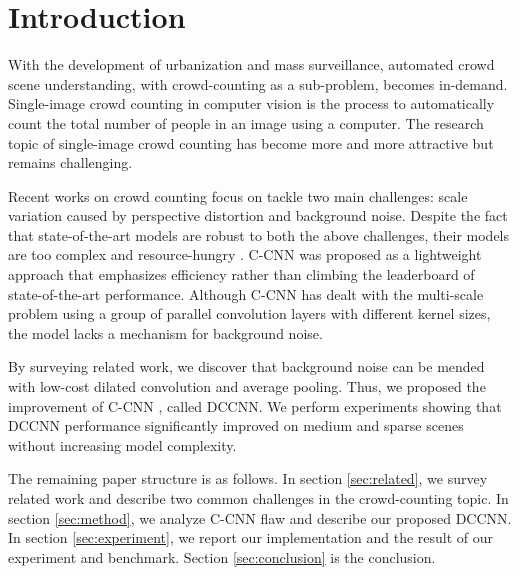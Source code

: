 \section{Introduction}







With the development of urbanization and mass surveillance, automated crowd scene understanding, with crowd-counting as a sub-problem, becomes in-demand. Single-image crowd counting in computer vision is the process to automatically count the total number of people in an image using a computer. The research topic of single-image crowd counting has become more and more attractive but remains challenging.


Recent works on crowd counting focus on tackle two main challenges: scale variation caused by perspective distortion and background noise. Despite the fact that state-of-the-art models are robust to both the above challenges, their models are too complex and resource-hungry \cite{liu2019context, jiang2019crowd, liu2019adcrowdnet, amirgholipour2020pdanet}. C-CNN \cite{9053780} was proposed as a lightweight approach that emphasizes efficiency rather than climbing the leaderboard of state-of-the-art performance. Although C-CNN \cite{9053780} has dealt with the multi-scale problem using a group of parallel convolution layers with different kernel sizes, the model lacks a mechanism for background noise. 


By surveying related work, we discover that background noise can be mended with low-cost dilated convolution and average pooling. Thus, we proposed the improvement of C-CNN \cite{9053780}, called DCCNN. We perform experiments showing that DCCNN performance significantly improved on medium and sparse scenes without increasing model complexity.

The remaining paper structure is as follows. In section \ref{sec:related}, we survey related work and describe two common challenges in the crowd-counting topic. In section \ref{sec:method}, we analyze C-CNN \cite{9053780} flaw and describe our proposed DCCNN. In section \ref{sec:experiment}, we report our implementation and the result of our experiment and benchmark. Section \ref{sec:conclusion} is the conclusion.
